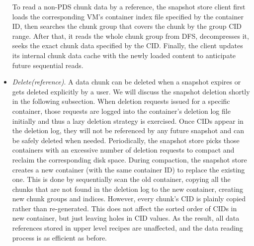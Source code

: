 \begin{itemize}
To read a non-PDS chunk data by a reference,  the snapshot store client first loads the
corresponding VM's container index file specified by the container ID, then searches the chunk
group  that  covers the chunk by the group  CID range.
After that, it reads the whole chunk group from DFS, decompresses it, seeks the exact chunk data 
specified by the CID. 
Finally, the client updates its internal chunk data cache with the newly loaded content to 
anticipate future sequential reads.
\item {\em Delete(reference)}.
A data chunk can be deleted when a snapshot expires or gets deleted explicitly by a user.
We will discuss the snapshot deletion shortly in the following subsection.
When deletion requests issued for a specific container,
those requests are logged into the  container's deletion log file initially and thus  a lazy
deletion strategy is exercised.
Once CIDs appear in
the deletion log, they will not be referenced by any future snapshot and can be safely deleted when needed. 
Periodically, the snapshot  store picks those containers with an excessive
number of deletion requests to  compact and  reclaim the corresponding disk space. 
During compaction, the snapshot store creates a new container (with the same container ID) to replace the 
existing one. This is done by sequentially scan the old container, copying all the chunks that are not 
found in the deletion log to the new container, creating new chunk groups and indices. 
However, every chunk's CID is plainly copied rather than re-generated. This does not affect the sorted
order of CIDs in new container, but just leaving holes in CID values. As the result, all data references stored 
in upper level recipes are unaffected, and the data reading process is as efficient as before.
\end{itemize}

%

